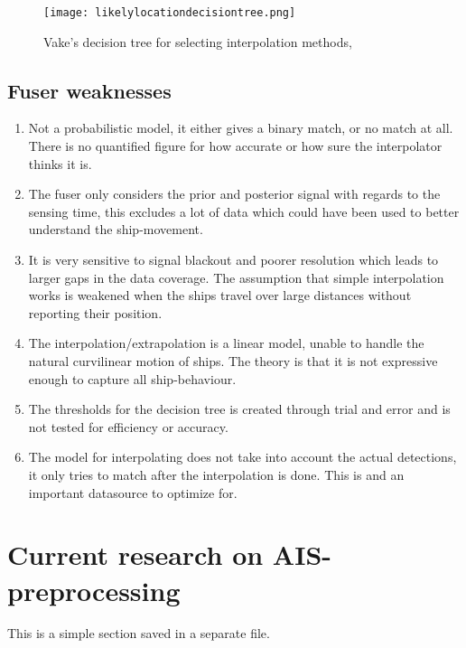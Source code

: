 \begin{figure}[h]
	\texttt{[image: likelylocationdecisiontree.png]}
	\centering
	\caption{Vake's decision tree for selecting interpolation methods,  }
	\centering
	\label{fig:decisiontree}
\end{figure}

\subsection{Fuser weaknesses}
\begin{enumerate}
	\item Not a probabilistic model, it either gives a binary match, or no match at all. There is no quantified figure for how accurate or how sure the interpolator thinks it is. 
	\item The fuser only considers the prior and posterior signal with regards to the sensing time, this excludes a lot of data which could have been used to better understand the ship-movement. 
	\item It is very sensitive to signal blackout and poorer resolution which leads to larger gaps in the data coverage. The assumption that simple interpolation works is weakened when the ships travel over large distances without reporting their position. 
	\item The interpolation/extrapolation is a linear model, unable to handle the natural curvilinear motion of ships. The theory is that it is not expressive enough to capture all ship-behaviour. 
	\item The thresholds for the decision tree is created through trial and error and is not tested for efficiency or accuracy.
	\item The model for interpolating does not take into account the actual detections, it only tries to match after the interpolation is done. This is and an important datasource to optimize for. 
\end{enumerate}	




\section{Current research on AIS-preprocessing}
\begin{info}{}
	This is a simple section saved in a separate file.
\end{info}




